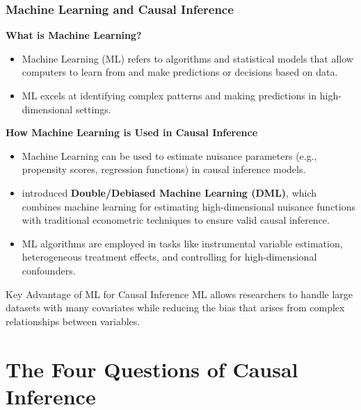 \documentclass[xcolor=svgnames,t]{beamer}
\begin{document}
\begin{frame}
    \frametitle{Machine Learning and Causal Inference}

    \textbf{What is Machine Learning?}
    \begin{itemize}
        \item Machine Learning (ML) refers to algorithms and statistical models that allow computers to learn from and make predictions or decisions based on data.
        \item ML excels at identifying complex patterns and making predictions in high-dimensional settings.
    \end{itemize}

    \pause %

    \textbf{How Machine Learning is Used in Causal Inference}
    \begin{itemize}
        \item Machine Learning can be used to estimate nuisance parameters (e.g., propensity scores, regression functions) in causal inference models.
        \item \cite{chernozhukov2018double} introduced \textbf{Double/Debiased Machine Learning (DML)}, which combines machine learning for estimating high-dimensional nuisance functions with traditional econometric techniques to ensure valid causal inference.
        \item ML algorithms are employed in tasks like instrumental variable estimation, heterogeneous treatment effects, and controlling for high-dimensional confounders.
    \end{itemize}

    \pause %
    \begin{block}{Key Advantage of ML for Causal Inference}
        ML allows researchers to handle large datasets with many covariates while reducing the bias that arises from complex relationships between variables. 
    \end{block}

\end{frame}


\section{The Four Questions of Causal Inference}
\end{document}
